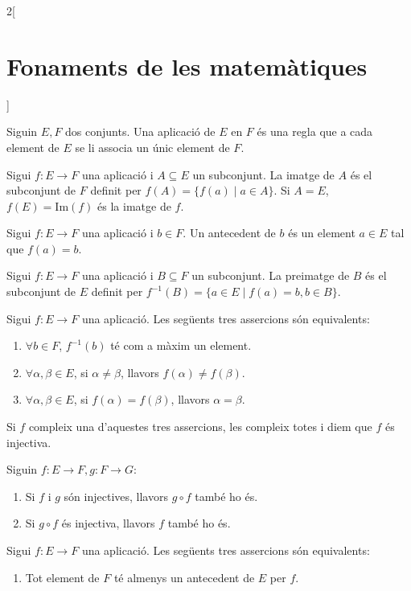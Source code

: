 \documentclass[class=article,10pt,crop=false]{standalone}
\begin{document}
\begin{multicols}{2}[\section{Fonaments de les matemàtiques}]
\begin{definition}
\end{definition}
\begin{definition}
Siguin $E,F$ dos conjunts. Una aplicació de $E$ en $F$ és una regla que a cada element de $E$ se li associa un únic element de $F$.
\end{definition}
\begin{definition}
Sigui $f:E\rightarrow F$ una aplicació i $A\subseteq E$ un subconjunt. La imatge de $A$ és el subconjunt de $F$ definit per $f(A)=\{f(a)\mid a\in A\}$. Si $A=E$, $f(E)=\text{Im}(f)$ és la imatge de $f$.
\end{definition}
\begin{definition}
Sigui $f:E\rightarrow F$ una aplicació i $b\in F$. Un antecedent de $b$ és un element $a\in E$ tal que $f(a)=b$.
\end{definition}
\begin{definition}
Sigui $f:E\rightarrow F$ una aplicació i $B\subseteq F$ un subconjunt. La preimatge de $B$ és el subconjunt de $E$ definit per $f^{-1}(B)=\{a\in E\mid f(a)=b,b\in B\}$.
\end{definition}
\begin{definition}
Sigui $f:E\rightarrow F$ una aplicació. Les següents tres assercions són equivalents:
\begin{enumerate}
    \item $\forall b\in F$, $f^{-1}(b)$ té com a màxim un element.
    \item $\forall\alpha,\beta\in E$, si $\alpha\ne\beta$, llavors $f(\alpha)\ne f(\beta)$.
    \item $\forall\alpha,\beta\in E$, si $f(\alpha)= f(\beta)$, llavors $\alpha=\beta$.
\end{enumerate}
Si $f$ compleix una d'aquestes tres assercions, les compleix totes i diem que $f$ és injectiva.
\end{definition}
\begin{prop}
Siguin $f:E\rightarrow F,g:F\rightarrow G$:
\begin{enumerate}
    \item Si $f$ i $g$ són injectives, llavors $g\circ f$ també ho és.
    \item Si $g\circ f$ és injectiva, llavors $f$ també ho és.
\end{enumerate}
\end{prop}
\begin{definition}
Sigui $f:E\rightarrow F$ una aplicació. Les següents tres assercions són equivalents:
\begin{enumerate}
    \item Tot element de $F$ té almenys un antecedent de $E$ per $f$.

\end{enumerate}
\end{definition}
\end{multicols}
\end{document}
